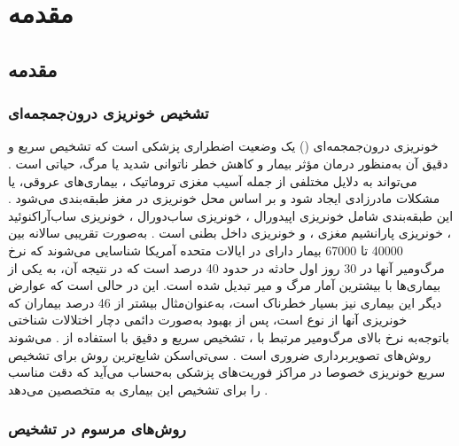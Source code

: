 \chapter{مقدمه}

\section{مقدمه}
\subsection{تشخیص خونریزی درون‌جمجمه‌ای}

خونریزی‌ درون‌جمجمه‌ای
 ()
یک وضعیت اضطراری پزشکی است که تشخیص سریع و دقیق آن به‌منظور درمان مؤثر بیمار و کاهش خطر ناتوانی شدید یا مرگ، حیاتی است \cite{grewal2018radnet}.
می‌تواند به دلایل مختلفی از جمله آسیب مغزی تروماتیک
، بیماری‌های عروقی، یا مشکلات مادرزادی ایجاد شود و بر اساس محل خونریزی در مغز طبقه‌بندی می‌شود \cite{monica2022detection}.
این طبقه‌بندی شامل خونریزی اپیدورال
 ، خونریزی ساب‌دورال
  ، خونریزی ساب‌آراکنوئید
   ، خونریزی پارانشیم مغزی 
   ، و خونریزی داخل بطنی
  است \cite{burduja2020accurate,hssayeni2020intracranial}. 
 به‌صورت تقریبی سالانه بین 40000 تا 67000 بیمار دارای
   در ایالات متحده آمریکا شناسایی می‌شوند که نرخ مرگ‌ومیر آنها در 30 روز اول حادثه در حدود 40 درصد است که در نتیجه آن، 
   به یکی از بیماری‌ها با بیشترین آمار مرگ و میر تبدیل شده است. این در حالی است که عوارض دیگر این بیماری نیز بسیار خطرناک است، به‌عنوان‌مثال بیشتر از 46 درصد بیماران که خونریزی آنها از نوع 
 است، پس از بهبود به‌صورت دائمی دچار اختلالات شناختی می‌شوند
  ‎\cite{arbabshirani2018advanced,burduja2020accurate,morgenstern2010guidelines,van2010incidence,hackett2000health}‎.
  باتوجه‌به نرخ بالای مرگ‌ومیر مرتبط با 
  ، تشخیص سریع و دقیق 
  با استفاده از روش‌های تصویربرداری ضروری است \cite{kuo2019expert}. سی‌تی‌اسکن
   شایع‌ترین روش برای تشخیص سریع خونریزی خصوصا در مراکز فوریت‌های پزشکی به‌حساب می‌آید که دقت مناسب را برای تشخیص این بیماری به متخصصین می‌دهد \cite{ye2019precise,grewal2018radnet,arbabshirani2018advanced,chilamkurthy2018deep}.


\subsection{روش‌های مرسوم در تشخیص }

